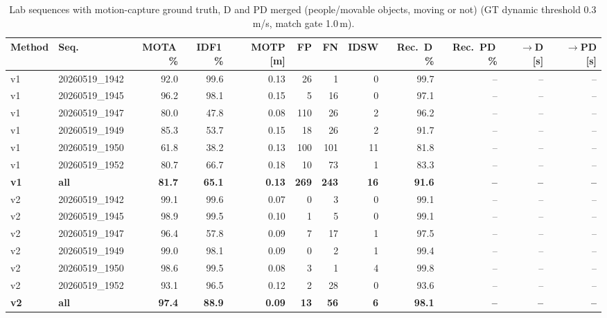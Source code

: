 \begin{table}[t]
\centering
\caption{Lab sequences with motion-capture ground truth, D and PD merged (people/movable objects, moving or not) (GT dynamic threshold 0.3\,m/s, match gate 1.0\,m).}
\label{tab:own_r7_merged}
\setlength{\tabcolsep}{3pt}
\begin{tabular}{llrrrrrrrrrr}
\toprule
Method & Seq. & MOTA\,\% & IDF1\,\% & MOTP [m] & FP & FN & IDSW & Rec.\ D\,\% & Rec.\ PD\,\% & $\to$D [s] & $\to$PD [s] \\
\midrule
v1 & 20260519\_1942 & 92.0 & 99.6 & 0.13 & 26 & 1 & 0 & 99.7 & -- & -- & -- \\
v1 & 20260519\_1945 & 96.2 & 98.1 & 0.15 & 5 & 16 & 0 & 97.1 & -- & -- & -- \\
v1 & 20260519\_1947 & 80.0 & 47.8 & 0.08 & 110 & 26 & 2 & 96.2 & -- & -- & -- \\
v1 & 20260519\_1949 & 85.3 & 53.7 & 0.15 & 18 & 26 & 2 & 91.7 & -- & -- & -- \\
v1 & 20260519\_1950 & 61.8 & 38.2 & 0.13 & 100 & 101 & 11 & 81.8 & -- & -- & -- \\
v1 & 20260519\_1952 & 80.7 & 66.7 & 0.18 & 10 & 73 & 1 & 83.3 & -- & -- & -- \\
\textbf{v1} & \textbf{all} & \textbf{81.7} & \textbf{65.1} & \textbf{0.13} & \textbf{269} & \textbf{243} & \textbf{16} & \textbf{91.6} & \textbf{--} & \textbf{--} & \textbf{--} \\
\midrule
v2 & 20260519\_1942 & 99.1 & 99.6 & 0.07 & 0 & 3 & 0 & 99.1 & -- & -- & -- \\
v2 & 20260519\_1945 & 98.9 & 99.5 & 0.10 & 1 & 5 & 0 & 99.1 & -- & -- & -- \\
v2 & 20260519\_1947 & 96.4 & 57.8 & 0.09 & 7 & 17 & 1 & 97.5 & -- & -- & -- \\
v2 & 20260519\_1949 & 99.0 & 98.1 & 0.09 & 0 & 2 & 1 & 99.4 & -- & -- & -- \\
v2 & 20260519\_1950 & 98.6 & 99.5 & 0.08 & 3 & 1 & 4 & 99.8 & -- & -- & -- \\
v2 & 20260519\_1952 & 93.1 & 96.5 & 0.12 & 2 & 28 & 0 & 93.6 & -- & -- & -- \\
\textbf{v2} & \textbf{all} & \textbf{97.4} & \textbf{88.9} & \textbf{0.09} & \textbf{13} & \textbf{56} & \textbf{6} & \textbf{98.1} & \textbf{--} & \textbf{--} & \textbf{--} \\
\bottomrule
\end{tabular}
\end{table}
